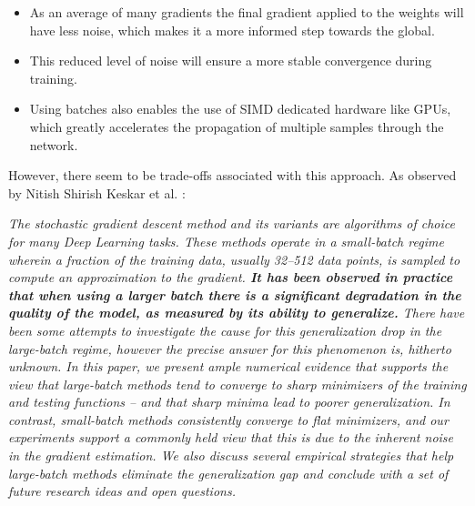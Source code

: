 \begin{itemize} 
  \item	
  As an average of many gradients the final gradient applied to the weights will have less
noise, which makes it a more informed step towards the global.
  \item 
  This reduced level of noise will ensure a more stable
convergence during training.
  \item
  Using batches also enables the use of \acf{SIMD} dedicated hardware like GPUs, 
  which greatly accelerates the propagation of multiple samples through the network.



\end{itemize}
 

However, there seem to be trade-offs associated with this approach.
As observed by Nitish Shirish Keskar et al.
\cite{26_large-batch-keskar2017} :

\begin{displayquote}
 
\textit{The stochastic gradient descent method and its variants are algorithms of choice for many Deep Learning tasks. These methods operate in a small-batch regime wherein a fraction of the training data, usually 32--512 data points, is sampled to compute an approximation to the gradient. \textbf{It has been observed in practice that when using a larger batch there is a significant degradation in the quality of the model, as measured by its ability to generalize.} 
There have been some attempts to investigate the cause for this generalization drop in the large-batch regime, however the precise answer for this phenomenon is, hitherto unknown. In this paper, we present ample numerical evidence that supports the view that large-batch methods tend to converge to sharp minimizers of the training and testing functions -- and that sharp minima lead to poorer generalization. In contrast, small-batch methods consistently converge to flat minimizers, and our experiments support a commonly held view that this is due to the inherent noise in the gradient estimation. We also discuss several empirical strategies that help large-batch methods eliminate the generalization gap and conclude with a set of future research ideas and open questions.}
 

\end{displayquote}

